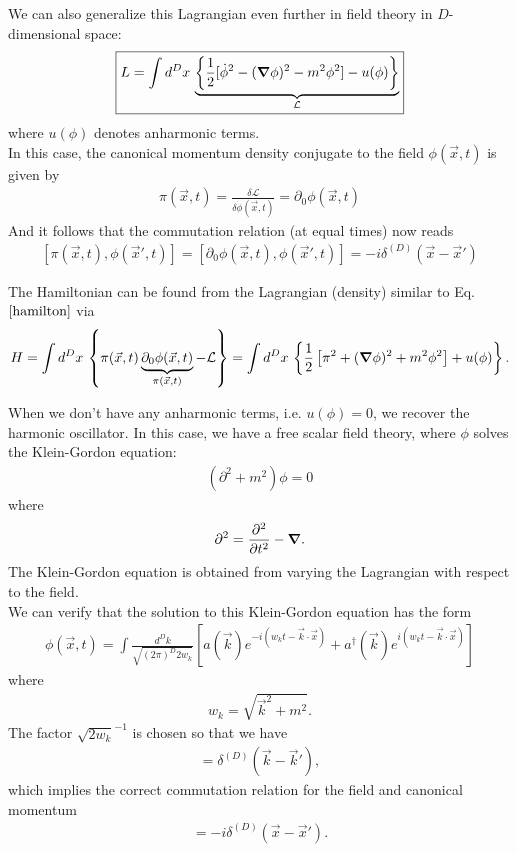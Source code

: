 \documentclass{book}
\theoremstyle{definition}
\newcommand{\p}{\partial}
\newcommand{\lag}{\mathcal{L}}
\newcommand{\f}[2]{\frac{#1}{#2}}
\newcommand{\lb}{\left[}
\newcommand{\rb}{\right]}
\newcommand{\lc}{\left\{}
\newcommand{\rc}{\right\}}
\begin{document}
We can also generalize this Lagrangian even further in field theory in $D$-dimensional space:
\begin{align}
\boxed{L = \int d^Dx\, \underbrace{\lc \f{1}{2}[\dot{\phi}^2 - (\grad{\phi})^2 - m^2 \phi^2] - u(\phi) \rc}_{\lag}}
\end{align}
where $u(\phi)$ denotes anharmonic terms. \\

In this case, the canonical momentum density conjugate to the field $\phi(\vec{x},t)$ is given by
\begin{align}
\boxed{\pi (\vec{x} ,t) = \f{\delta \lag}{\delta\dot{\phi}(\vec{x},t)} = \p_0 \phi(\vec{x},t) }
\end{align}
And it follows that the commutation relation (at equal times) now reads
\begin{align}
\boxed{\lb \pi(\vec{x},t), \phi(\vec{x}',t) \rb = \lb \p_0 \phi(\vec{x},t), \phi(\vec{x}',t) \rb = -i\delta^{(D)}(\vec{x} - \vec{x}')}
\end{align}


The Hamiltonian can be found from the Lagrangian (density) similar to Eq. $\eqref{hamilton}$ via 
\begin{align}
H = \int d^D x\, \lc \pi(\vec{x},t) \underbrace{\p_0\phi(\vec{x},t)}_{\pi(\vec{x},t)} - \lag \rc = \int d^Dx\, \lc \f{1}{2}\lb\pi^2 + (\grad{\phi})^2 + m^2 \phi^2\rb     + u(\phi) \rc.
\end{align}

When we don't have any anharmonic terms, i.e. $u(\phi) = 0$, we recover the harmonic oscillator. In this case, we have a free scalar field theory, where $\phi$ solves the Klein-Gordon equation:
\begin{align}
(\p^2 + m^2)\phi  = 0
\end{align}
where
\begin{align}
\p^2 = \f{\p^2}{\p t^2} - \grad.
\end{align}
The Klein-Gordon equation is obtained from varying the Lagrangian with respect to the field. \\

We can verify that the solution to this Klein-Gordon equation has the form
\begin{align}
\boxed{\phi(\vec{x},t) = \int \f{d^D k}{\sqrt{(2\pi)^D 2 w_k}} \lb a(\vec{k})e^{-i(w_k t - \vec{k}\cdot\vec{x})} + a^\dagger(\vec{k})e^{i(w_k t - \vec{k}\cdot \vec{x})} \rb}
\end{align}
where 
\begin{align}
w_k = \sqrt{\vec{k}^2 + m^2}.
\end{align}
The factor $\sqrt{2w_k}^{-1}$ is chosen so that we have
\begin{align}
[a(\vec{k}), a^\dagger(\vec{k})] = \delta^{(D)}(\vec{k} - \vec{k}'),
\end{align}
which implies the correct commutation relation for the field and canonical momentum 
\begin{align}
[\p_0 \phi(\vec{x}, t), \phi(\vec{x}', t)]  = -i\delta^{(D)}(\vec{x} - \vec{x}').
\end{align}
\end{document}
